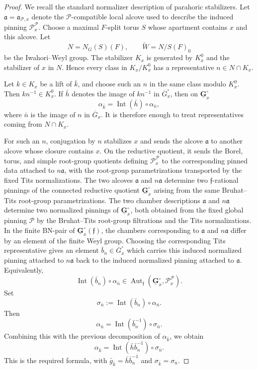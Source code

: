 \documentclass{amsart}
\theoremstyle{plain}
\numberwithin{equation}{section}
\theoremstyle{definition}
\newcommand{\cP}{\mathcal{P}}
\newcommand{\ff}{\mathfrak{f}}
\newcommand{\Aut}{\operatorname{Aut}}
\begin{document}
\begin{proof}
We recall the standard normalizer description of parahoric stabilizers.  Let
\(\mathfrak a=\mathfrak a_{\cP,x}\) denote the \(\cP\)-compatible local alcove
used to describe the induced pinning \(\cP_x^{\cP}\).  Choose a maximal
\(F\)-split torus \(S\) whose apartment contains \(x\) and this alcove.  Let
\[
        N=N_G(S)(F),
        \qquad
        \widetilde W=N/S(F)_0
\]
be the Iwahori--Weyl group.  The stabilizer \(K_x\) is generated by \(K_x^0\) and
the stabilizer of \(x\) in \(N\).  Hence every class in
\(K_x/K_x^0\) has a representative \(n\in N\cap K_x\).

Let \(k\in K_x\) be a lift of \(\bar k\), and choose such an \(n\) in the same
class modulo \(K_x^0\).  Then \(kn^{-1}\in K_x^0\).  If \(\bar h\) denotes the
image of \(kn^{-1}\) in \(\overline G_x^\circ\), then on
\(\underline{\mathbf G}_x^\circ\)
\[
        \alpha_{\bar k}
        =
        \operatorname{Int}(\bar h)\circ\alpha_{\bar n},
\]
where \(\bar n\) is the image of \(n\) in \(\overline G_x\).  It is therefore
enough to treat representatives coming from \(N\cap K_x\).

For such an \(n\), conjugation by \(n\) stabilizes \(x\) and sends the alcove
\(\mathfrak a\) to another alcove whose closure contains \(x\).  On the reductive
quotient, it sends the Borel, torus, and simple root-group quotients defining
\(\cP_x^{\cP}\) to the corresponding pinned data attached to
\(n\mathfrak a\), with the root-group parametrizations transported by the fixed
Tits normalizations.  The two alcoves \(\mathfrak a\) and \(n\mathfrak a\)
determine two \(\ff\)-rational pinnings of the connected reductive quotient
\(\underline{\mathbf G}_x^\circ\) arising from the same Bruhat--Tits root-group
parametrizations.  The two chamber descriptions \(\mathfrak a\) and \(n\mathfrak a\) determine
two normalized pinnings of \(\underline{\mathbf G}_x^\circ\), both obtained
from the fixed global pinning \(\cP\) by the Bruhat--Tits root-group
filtrations and the Tits normalizations.  In the finite BN-pair of
\(\underline{\mathbf G}_x^\circ(\ff)\), the chambers corresponding to
\(\mathfrak a\) and \(n\mathfrak a\) differ by an element of the finite Weyl
group.  Choosing the corresponding Tits representative gives an element
\(\bar b_n\in \overline G_x^\circ\) which carries this induced normalized
pinning attached to \(n\mathfrak a\) back to the induced normalized pinning
attached to \(\mathfrak a\).
Equivalently,
\[
        \operatorname{Int}(\bar b_n)\circ\alpha_{\bar n}
        \in
        \Aut_\ff(\underline{\mathbf G}_x^\circ,\cP_x^{\cP}).
\]
Set
\[
        \sigma_{\bar n}:=
        \operatorname{Int}(\bar b_n)\circ\alpha_{\bar n}.
\]
Then
\[
        \alpha_{\bar n}
        =
        \operatorname{Int}(\bar b_n^{-1})\circ\sigma_{\bar n}.
\]
Combining this with the previous decomposition of \(\alpha_{\bar k}\), we obtain
\[
        \alpha_{\bar k}
        =
        \operatorname{Int}(\bar h\bar b_n^{-1})\circ\sigma_{\bar n}.
\]
This is the required formula, with
\(\bar g_{\bar k}=\bar h\bar b_n^{-1}\) and
\(\sigma_{\bar k}=\sigma_{\bar n}\).


\end{proof}
\end{document}
